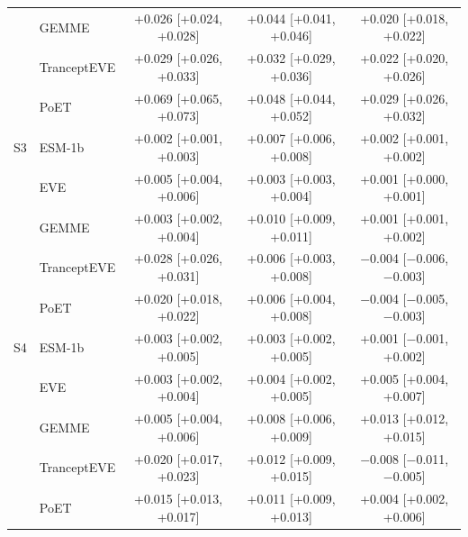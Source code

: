 \begin{tabular}{llccc}
 & GEMME & +0.026 [+0.024, +0.028] & +0.044 [+0.041, +0.046] & +0.020 [+0.018, +0.022] \\
 & TranceptEVE & +0.029 [+0.026, +0.033] & +0.032 [+0.029, +0.036] & +0.022 [+0.020, +0.026] \\
 & PoET & +0.069 [+0.065, +0.073] & +0.048 [+0.044, +0.052] & +0.029 [+0.026, +0.032] \\
\midrule
S3 & ESM-1b & +0.002 [+0.001, +0.003] & +0.007 [+0.006, +0.008] & +0.002 [+0.001, +0.002] \\
 & EVE & +0.005 [+0.004, +0.006] & +0.003 [+0.003, +0.004] & +0.001 [+0.000, +0.001] \\
 & GEMME & +0.003 [+0.002, +0.004] & +0.010 [+0.009, +0.011] & +0.001 [+0.001, +0.002] \\
 & TranceptEVE & +0.028 [+0.026, +0.031] & +0.006 [+0.003, +0.008] & $-$0.004 [$-$0.006, $-$0.003] \\
 & PoET & +0.020 [+0.018, +0.022] & +0.006 [+0.004, +0.008] & $-$0.004 [$-$0.005, $-$0.003] \\
\midrule
S4 & ESM-1b & +0.003 [+0.002, +0.005] & +0.003 [+0.002, +0.005] & +0.001 [$-$0.001, +0.002] \\
 & EVE & +0.003 [+0.002, +0.004] & +0.004 [+0.002, +0.005] & +0.005 [+0.004, +0.007] \\
 & GEMME & +0.005 [+0.004, +0.006] & +0.008 [+0.006, +0.009] & +0.013 [+0.012, +0.015] \\
 & TranceptEVE & +0.020 [+0.017, +0.023] & +0.012 [+0.009, +0.015] & $-$0.008 [$-$0.011, $-$0.005] \\
 & PoET & +0.015 [+0.013, +0.017] & +0.011 [+0.009, +0.013] & +0.004 [+0.002, +0.006] \\
\bottomrule
\end{tabular}
